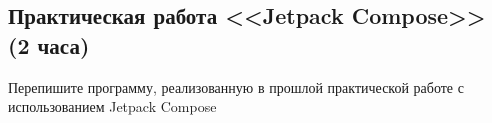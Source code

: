 \subsection{Практическая работа <<Jetpack Compose>> (2 часа)} 

Перепишите программу, реализованную в прошлой практической работе с использованием Jetpack Compose

